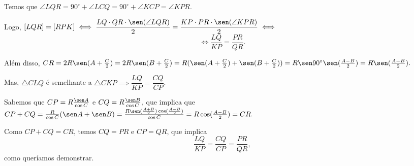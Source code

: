 \begin{center}

\end{center}

Temos que $\angle LQR = 90^\circ + \angle LCQ = 90^\circ + \angle KCP = \angle KPR$.

Logo, $[LQR] = [RPK] \iff \dfrac{LQ \cdot QR \cdot \sen(\angle LQR)}{2} = \dfrac{KP \cdot PR \cdot \sen(\angle KPR)}{2} \iff$
$$\iff \frac{LQ}{KP} = \frac{PR}{QR}.$$

Além disso, $CR = 2R \sen(A + \frac{C}{2}) = 2R \sen(B + \frac{C}{2}) = R (\sen (A + \frac{C}{2}) + \sen (B + \frac{C}{2})) = R \sen 90^\circ \sen(\frac{A-B}{2}) = R \sen(\frac{A-B}{2}).$

Mas, $\triangle CLQ$ é semelhante a $\triangle CKP \implies \dfrac{LQ}{KP} = \dfrac{CQ}{CP}$.

Sabemos que $CP = R \frac{\sen A}{\cos C}$ e $CQ = R \frac{\sen B}{\cos C}$, que implica que $CP + CQ = \frac{R}{\cos C} (\sen A + \sen B) = \frac{R \sen(\frac{A+B}{2}) \cos(\frac{A-B}{2})}{\cos C} = R \cos(\frac{A-B}{2}) = CR.$

Como $CP + CQ = CR$, temos $CQ = PR$ e $CP = QR$, que implica
$$\frac{LQ}{KP} = \frac{CQ}{CP} = \frac{PR}{QR},$$
como queríamos demonstrar.
